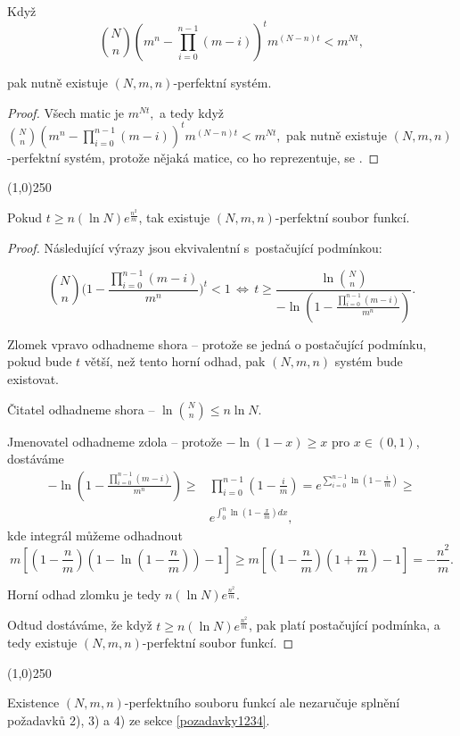 \documentclass[a4paper,12pt]{article}
\newenvironment{myproof}{
  \begin{proof}
    
  }{
  \end{proof}
  \begin{center}
   \line(1,0){250}
   \end{center}
  }
\begin{document}
\begin{lemma}
    Když 
    $$\binom Nn(m^n-\prod_{i=0}^{n-1}(m-i))^tm^{(N-n)t}<m^{Nt},$$

    pak nutně existuje $(N,m,n)$-perfektní systém.
\end{lemma}

\begin{myproof}
Všech matic je $m^{Nt},$ a tedy  když $\binom Nn(m^n-\prod_{i=0}^{n-1}(m-i))^tm^{(N-n)t}<m^{Nt},$ pak nutně existuje $(N,m,n)$-perfektní systém, protože nějaká matice, co ho reprezentuje, se .
\end{myproof}

\begin{veta}
    Pokud $t\ge n(\ln N)e^{\frac {n^2}m}$, tak existuje $(N,m,n)$-perfektní soubor funkcí. 
\end{veta}

\begin{myproof}

Následující vý\-ra\-zy jsou ekvivalentní s~postačující podmínkou:

$$\binom Nn\big(1-\frac {\prod_{i=0}^{n-1}(m-i)}{m^n}\big)^t<1\,\Leftrightarrow\,
t\ge\frac {\ln\binom Nn}{-\ln(1-\frac {\prod_{i=0}^{n-1}(m-i)}{m^
n})}.$$

Zlomek vpravo odhadneme shora -- protože se jedná o postačující podmínku, pokud bude $t$ větší, než tento horní odhad, pak $(N,m,n)$ systém bude existovat.

Čitatel odhadneme shora -- $\ln\binom Nn\le n\ln N$.

Jmenovatel odhadneme zdola -- protože $-\ln(1-x)\ge x$ pro $
x\in (0,1)$, dostáváme
\begin{align*}-\ln(1-\frac {\prod_{i=0}^{n-1}(m-i)}{m^n})\ge&\prod_{i=0}^{
n-1}(1-\frac im)=e^{\sum_{i=0}^{n-1}\ln(1-\frac im)}\ge\\
&e^{\int_0^n\ln(1-\frac xm)dx},\end{align*}
kde integrál můžeme odhadnout 
$$m[(1-\frac nm)(1-\ln(1-\frac nm))-1]\ge m[(1-\frac nm)(1+\frac 
nm)-1]=-\frac {n^2}m.$$

Horní odhad zlomku je tedy $n(\ln N)e^{\frac {n^2}m}$.

Odtud dostáváme, že když $t\ge n(\ln N)e^{\frac {n^2}m}$, pak platí postačující podmínka, a tedy 
existuje $(N,m,n)$-perfektní soubor funkcí. 
\end{myproof}

Existence $(N,m,n)$-perfektního souboru funkcí ale 
nezaručuje splnění požadavků 2), 3) a 4) ze sekce \ref{pozadavky1234}.
\end{document}
